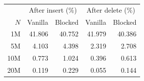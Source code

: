 \begin{tabular}{rrrrr}
\toprule
& \multicolumn{2}{c}{After insert (\%)} & \multicolumn{2}{c}{After delete (\%)} \\
$N$ & Vanilla & Blocked & Vanilla & Blocked \\
\midrule
1M & 41.806 & 40.752 & 41.979 & 40.386 \\
5M & 4.103 & 4.398 & 2.319 & 2.708 \\
10M & 0.773 & 1.024 & 0.396 & 0.613 \\
20M & 0.119 & 0.229 & 0.055 & 0.144 \\
\bottomrule
\end{tabular}